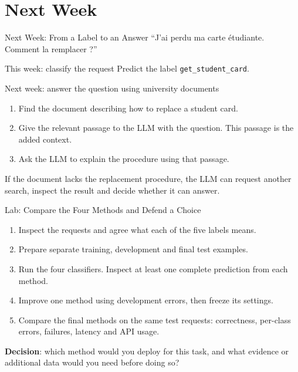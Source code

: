 \documentclass[aspectratio=169]{beamer}
\begin{document}
\section{Next Week}

\begin{frame}{Next Week: From a Label to an Answer}
  \small ``J'ai perdu ma carte étudiante. Comment la remplacer ?''
  \begin{block}{This week: classify the request}
    \small Predict the label \texttt{get\_student\_card}.
  \end{block}
  \begin{block}{Next week: answer the question using university documents}
    \small
    \begin{enumerate}
      \item Find the document describing how to replace a student card.
      \item Give the relevant passage to the LLM with the question. This passage is the added context.
      \item Ask the LLM to explain the procedure using that passage.
    \end{enumerate}
  \end{block}
  \small If the document lacks the replacement procedure, the LLM can request another search, inspect the result and decide whether it can answer.
\end{frame}

\begin{frame}{Lab: Compare the Four Methods and Defend a Choice}
  \begin{enumerate}
    \item Inspect the requests and agree what each of the five labels means.
    \item Prepare separate training, development and final test examples.
    \item Run the four classifiers. Inspect at least one complete prediction from each method.
    \item Improve one method using development errors, then freeze its settings.
    \item Compare the final methods on the same test requests: correctness, per-class errors, failures, latency and API usage.
  \end{enumerate}
  \par\vspace{0.6em}
  \textbf{Decision}: which method would you deploy for this task, and what evidence or additional data would you need before doing so?
\end{frame}
\end{document}

